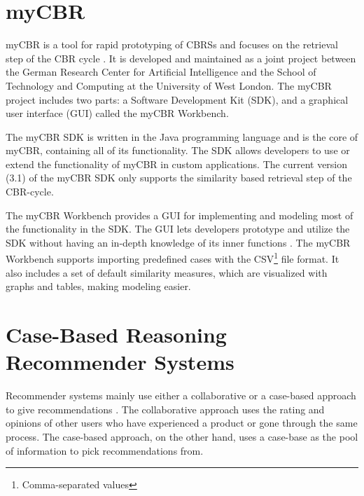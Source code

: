 \section{myCBR}

myCBR is a tool for rapid prototyping of CBRSs and focuses on the retrieval step of the CBR cycle \cite{Stahl2008}. It is developed and maintained as a joint project between the German Research Center for Artificial Intelligence and the School of Technology and Computing at the University of West London. The myCBR project includes two parts: a Software Development Kit (SDK), and a graphical user interface (GUI) called the myCBR Workbench. 

The myCBR SDK is written in the Java programming language and is the core of myCBR, containing all of its functionality. The SDK allows developers to use or extend the functionality of myCBR in custom applications. The current version (3.1) of the myCBR SDK only supports the similarity based retrieval step of the CBR-cycle.

The myCBR Workbench provides a GUI for implementing and modeling most of the functionality in the SDK. The GUI lets developers prototype and utilize the SDK without having an in-depth knowledge of its inner functions \cite{bach2014knowledge}. The myCBR Workbench supports importing predefined cases with the CSV\footnote{Comma-separated values} file format. It also includes a set of default similarity measures, which are visualized with graphs and tables, making modeling easier.

\section{Case-Based Reasoning Recommender Systems}\label{sec:case_based_recommender_systems}

Recommender systems mainly use either a collaborative or a case-based approach to give recommendations \cite{bridge2005case}. The collaborative approach uses the rating and opinions of other users who have experienced a product or gone through the same process. The case-based approach, on the other hand, uses a case-base as the pool of information to pick recommendations from.

